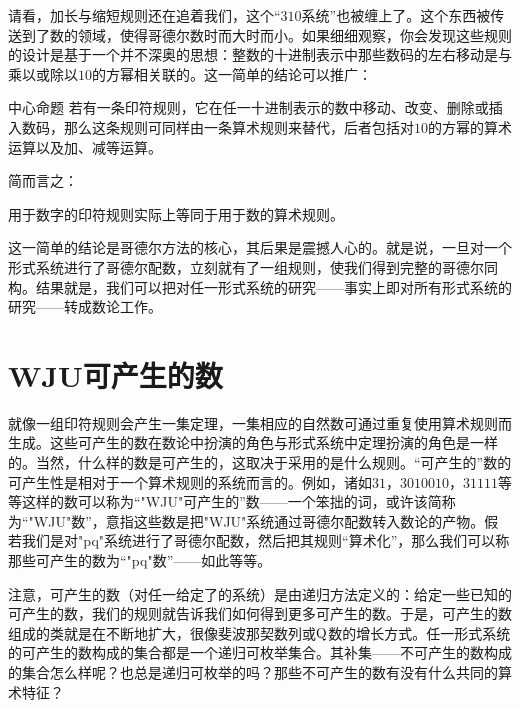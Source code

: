 
请看，加长与缩短规则还在追着我们，这个“$310$系统”也被缠上了。这个东西被传送到了数的领域，使得哥德尔数时而大时而小。如果细细观察，你会发现这些规则的设计是基于一个并不深奥的思想：整数的十进制表示中那些数码的左右移动是与乘以或除以$10$的方幂相关联的。这一简单的结论可以推广：

\begin{thm}{中心命题}
若有一条印符规则，它在任一十进制表示的数中移动、改变、删除或插入数码，那么这条规则可同样由一条算术规则来替代，后者包括对$10$的方幂的算术运算以及加、减等运算。
\end{thm}
简而言之：

\begin{block}
用于数字的印符规则实际上等同于用于数的算术规则。
\end{block}

这一简单的结论是哥德尔方法的核心，其后果是震撼人心的。就是说，一旦对一个形式系统进行了哥德尔配数，立刻就有了一组规则，使我们得到完整的哥德尔同构。结果就是，我们可以把对任一形式系统的研究——事实上即对所有形式系统的研究——转成数论工作。

\section{WJU可产生的数}

就像一组印符规则会产生一集定理，一集相应的自然数可通过重复使用算术规则而生成。这些可产生的数在数论中扮演的角色与形式系统中定理扮演的角色是一样的。当然，什么样的数是可产生的，这取决于采用的是什么规则。“可产生的”数的可产生性是相对于一个算术规则的系统而言的。例如，诸如$31$，$3010010$，$31111$等等这样的数可以称为“"WJU"可产生的”数——一个笨拙的词，或许该简称为“"WJU"数”，意指这些数是把"WJU"系统通过哥德尔配数转入数论的产物。假若我们是对"pq"系统进行了哥德尔配数，然后把其规则“算术化”，那么我们可以称那些可产生的数为“"pq"数”——如此等等。

注意，可产生的数（对任一给定了的系统）是由递归方法定义的：给定一些已知的可产生的数，我们的规则就告诉我们如何得到更多可产生的数。于是，可产生的数组成的类就是在不断地扩大，很像斐波那契数列或$\operatorname{Q}$数的增长方式。任一形式系统的可产生的数构成的集合都是一个递归可枚举集合。其补集——不可产生的数构成的集合怎么样呢？也总是递归可枚举的吗？那些不可产生的数有没有什么共同的算术特征？

